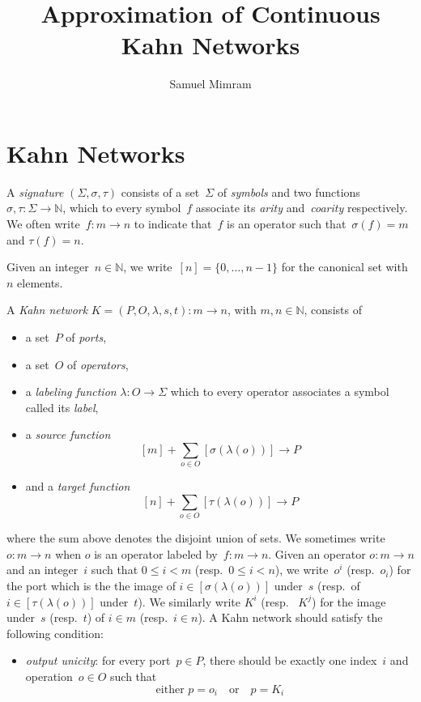 \documentclass{article}
\title{Approximation of Continuous Kahn Networks}
\author{Samuel Mimram}
\newcommand{\N}{\mathbb{N}}
\newcommand{\intset}[1]{[#1]}
\newcommand{\resp}{resp.~}
\newcommand{\qtext}[1]{\quad\text{#1}\quad}
\begin{document}
\maketitle

\section{Kahn Networks}
A \emph{signature} $(\Sigma,\sigma,\tau)$ consists of a set~$\Sigma$ of
\emph{symbols} and two functions \hbox{$\sigma,\tau:\Sigma\to\N$}, which to
every symbol~$f$ associate its \emph{arity} and~\emph{coarity} respectively. We
often write~$f:m\to n$ to indicate that~$f$ is an operator such that~$\sigma(f)=m$
and \hbox{$\tau(f)=n$}.

Given an integer~$n\in\N$, we write~$\intset{n}=\{0,\ldots,n-1\}$ for the
canonical set with~$n$ elements.

A \emph{Kahn network} $K=(P,O,\lambda,s,t):m\to n$, with $m,n\in\N$, consists of
\begin{itemize}
\item a set~$P$ of \emph{ports},
\item a set~$O$ of \emph{operators},
\item a \emph{labeling function} $\lambda:O\to\Sigma$ which to every operator
  associates a symbol called its \emph{label},
\item a \emph{source function}
  \[
  \intset{m}+\sum_{o\in O}\intset{\sigma(\lambda(o))}\to P
  \]
\item and a \emph{target function}
  \[
  \intset{n}+\sum_{o\in O}\intset{\tau(\lambda(o))}\to P
  \]
\end{itemize}
where the sum above denotes the disjoint union of sets. We sometimes write
$o:m\to n$ when $o$ is an operator labeled by~$f:m\to n$. Given an operator
\hbox{$o:m\to n$} and an integer~$i$ such that $0\leq i<m$ (\resp $0\leq i<n$),
we write~$o^i$ (\resp $o_i$) for the port which is the the image of
$i\in\intset{\sigma(\lambda(o))}$ under~$s$ (\resp of
$i\in\intset{\tau(\lambda(o))}$ under~$t$). We similarly write $K^i$ (\resp
$K^j$) for the image under~$s$ (\resp $t$) of $i\in m$ (\resp $i\in n$). A Kahn
network should satisfy the following condition:
\begin{itemize}
\item \emph{output unicity}: for every port~$p\in P$, there should be exactly
  one index~$i$ and operation~$o\in O$ such that
  \[
  \text{either } p=o_i \qtext{or} p=K_i
  \]
\end{itemize}
\end{document}
